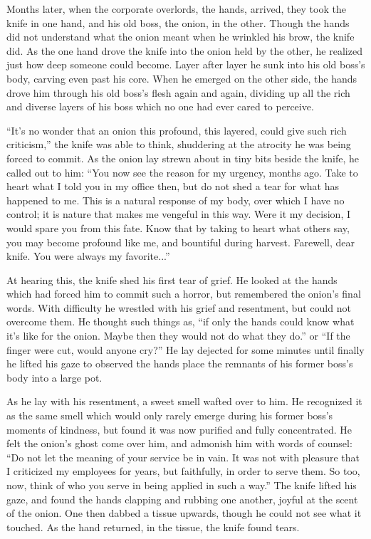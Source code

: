 \documentclass[12pt]{article}
\begin{document}
Months later, when the corporate overlords, the hands, arrived, they took the knife in one hand, and his old boss, the onion, in the other. Though the hands did not understand what the onion meant when he wrinkled his brow, the knife did. As the one hand drove the knife into the onion held by the other, he realized just how deep someone could become. Layer after layer he sunk into his old boss's body, carving even past his core. When he emerged on the other side, the hands drove him through his old boss's flesh again and again, dividing up all the rich and diverse layers of his boss which no one had ever cared to perceive. 

``It's no wonder that an onion this profound, this layered, could give such rich criticism,'' the knife was able to think, shuddering at the atrocity he was being forced to commit. As the onion lay strewn about in tiny bits beside the knife, he called out to him: ``You now see the reason for my urgency, months ago. Take to heart what I told you in my office then, but do not shed a tear for what has happened to me. This is a natural response of my body, over which I have no control; it is nature that makes me vengeful in this way. Were it my decision, I would spare you from this fate. Know that by taking to heart what others say, you may become profound like me, and bountiful during harvest. Farewell, dear knife. You were always my favorite...''

%
At hearing this, the knife shed his first tear of grief. He looked at the hands which had forced him to commit such a horror, but remembered the onion's final words. With difficulty he wrestled with his grief and resentment, but could not overcome them. He thought such things as, ``if only the hands could know what it's like for the onion. Maybe then they would not do what they do.'' or ``If the finger were cut, would anyone cry?'' He lay dejected for some minutes until finally he lifted his gaze to observed the hands place the remnants of his former boss's body into a large pot.

As he lay with his resentment, a sweet smell wafted over to him. He recognized it as the same smell which would only rarely emerge during his former boss's moments of kindness, but found it was now purified and fully concentrated. He felt the onion's ghost come over him, and admonish him with words of counsel: ``Do not let the meaning of your service be in vain. It was not with pleasure that I criticized my employees for years, but faithfully, in order to serve them. So too, now, think of who you serve in being applied in such a way.'' The knife lifted his gaze, and found the hands clapping and rubbing one another, joyful at the scent of the onion. One then dabbed a tissue upwards, though he could not see what it touched. As the hand returned, in the tissue, the knife found tears.
\end{document}
